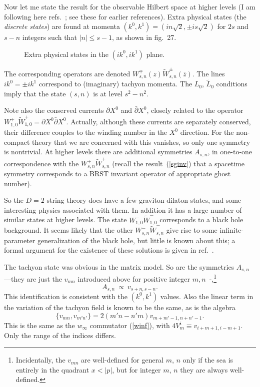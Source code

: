 Now let me state the result for the observable
Hilbert space at higher levels (I am following here
refs.~\cite{Wgr}; see these for earlier references).  Extra physical
states  (the {\it discrete states}) are found at momenta $(k^0,k^1) =
(i n \sqrt{2}, \pm i s \sqrt{2})$ for $2s$ and
$s-n$
integers such that $|n| \leq s-1$, as shown in fig.~27.
\begin{figure}
\begin{center}
\leavevmode
{}
\end{center}
\caption[]{Extra physical states in the $(i k^0,i k^1)$ plane.}
\end{figure}
The
corresponding operators are denoted $W_{s,n}^{\mp}(z) \tilde
W_{s,n}^{\pm}(\bar z)$.  The lines $i k^0 = \pm i k^1$ correspond
to (imaginary) tachyon momenta.  The  
$L_0$, $\tilde L_0$ conditions imply that the state $(s, n)$ is at
level $s^2 - n^2$.

Note also the conserved currents $\partial X^0$ and $\bar\partial
X^0$, closely related to the operator $W_{1,0}^{+}\tilde
W_{1,0}^{+} = \partial X^0\bar\partial X^0$.  Actually, although
these currents are separately conserved, their difference couples to
the winding number in the $X^0$ direction.  For the non-compact
theory that we are concerned with this vanishes, so only one
symmetry is nontrivial.
At higher levels there are
additional symmetries $A_{s,n}$, in one-to-one
correspondence with the
$W_{s,n}^{+}\tilde W_{s,n}^{+}$ (recall the
result~(\ref{sginv}) that a spacetime symmetry corresponds to a BRST
invariant operator of appropriate ghost number).

So the $D=2$ string theory does have a few graviton-dilaton states,
and some interesting physics associated with them.  In addition it
has a large number of similar states at higher levels.  
The state $W_{1,0}^{-}\tilde W_{1,0}^{-}$ corresponds to a black
hole background.  It
seems likely that the other $W_{s,n}^{-}\tilde W_{s,n}^{-}$ give
rise to some infinite-parameter generalization of the black hole,
but little is known about this; a formal argument for the
existence of these solutions is given in ref.~\cite{Sbhgen}.

The tachyon state was obvious in the matrix model.  So are the
symmetries $A_{s,n}$---they are just the $v_{mn}$ introduced above
for positive integer $m,n$~\cite{AJw}-\cite{MPW},\footnote
{Incidentally, the $v_{mn}$ are well-defined for general $m$, $n$
only if the sea is entirely in the quadrant $x < |p|$, but for
integer $m$, $n$ they are always well-defined.}
\begin{equation}
A_{s,n} \ \propto\ v_{s+n, s-n}.
\end{equation}
This identification is consistent with the $(k^0,k^1)$ values.
Also the linear term in the variation of the
tachyon field is known to be the same, as is the algebra
\begin{equation}
\{ v_{mn}, v_{m'n'} \} = 2 (m'n - n'm) v_{m+m'-1,n+n'-1}.
\end{equation}
This is the same as the $w_\infty$ commutator (\ref{winf}), with
$4 V^i_m \equiv v_{i+m+1,i-m+1}$.  Only the range of the indices
differs.

